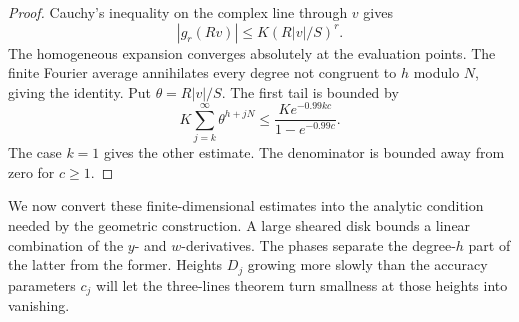 \begin{proof}
Cauchy's inequality on the complex line through $v$ gives
\[
 |g_r(Rv)|\le K(R|v|/S)^r.
\]
The homogeneous expansion converges absolutely at the evaluation
points.  The finite Fourier average annihilates every degree not
congruent to $h$ modulo $N$, giving the identity.  Put
$\theta=R|v|/S$.  The first tail is bounded by
\[
 K\sum_{j=k}^{\infty}\theta^{h+jN}
   \le\frac{K e^{-0.99kc}}{1-e^{-0.99c}}.
\]
The case $k=1$ gives the other estimate.  The denominator is
bounded away from zero for $c\ge1$.
\end{proof}

We now convert these finite-dimensional estimates into the analytic
condition needed by the geometric construction. A large sheared disk
bounds a linear combination of the $y$- and $w$-derivatives. The phases
separate the degree-$h$ part of the latter from the former. Heights
$D_j$ growing more slowly than the accuracy parameters $c_j$ will let
the three-lines theorem turn smallness at those heights into vanishing.

